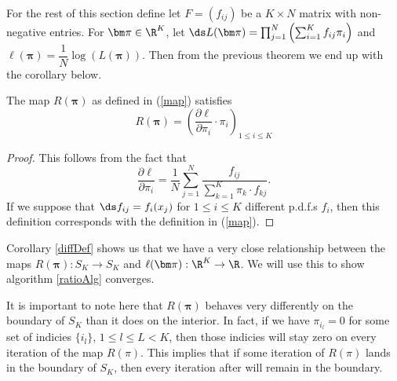 For the rest of this section define let $F=(f_{ij})$ be a $K\times N$ matrix with non-negative entries.  For $\bm\pi\in\R^K$, let $\ds L(\bm\pi)=\prod_{j=1}^{N}\left(\sum_{i=1}^{K}f_{ij}\pi_{i}\right)$ and $\ell(\bm\pi)={\dfrac{1}{N}}\log(L(\bm\pi))$. Then from the previous theorem we end up with the corollary below.

\begin{cor}\label{diffDef}
 The map $R(\bm\pi)$ as defined in (\ref{map}) satisfies
\[R(\bm\pi)=\left(\frac{\partial\ell}{\partial\pi_i}\cdot\pi_i\right)_{1\leq i\leq K}\]
\end{cor}
\begin{proof}
This follows from the fact that 
\[\frac{\partial\ell}{\partial\pi_i}=\frac 1N\sum_{j=1}^{N}\frac{f_{ij}}{\sum_{k=1}^{K}\pi_k\cdot f_{kj}}.\]
If we suppose that $\ds f_{ij}=f_{i}(x_j)$ for $1\leq i\leq K$ different p.d.f.s $f_i$, then this definition corresponds with the definition in (\ref{map}).

\end{proof}

Corollary \ref{diffDef} shows us that we have a very close relationship between the maps $R(\bm\pi):S_K\rightarrow S_K$ and $\ell(\bm\pi):\R^K\rightarrow \R$. We will use this to show algorithm \ref{ratioAlg} converges.  

\begin{rk}\label{boundary}

It is important to note here that $R(\bm\pi)$ behaves very differently on the boundary of $S_K$ than it does on the interior. In fact, if we have $\pi_{i_l}=0$ for some set of indicies $\{i_l\}$, $1\leq l\leq L < K$, then those indicies will stay zero on every iteration of the map $R(\pi)$.  This implies that if some iteration of $R(\pi)$ lands in the boundary of $S_K$, then every iteration after will remain in the boundary.

\end{rk}



